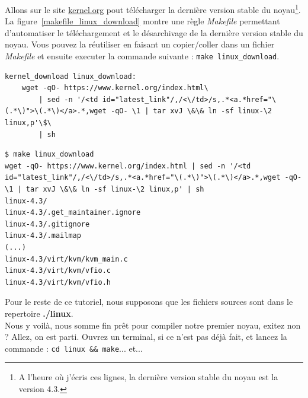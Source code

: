 \documentclass[a4paper]{article}
\begin{document}
Allons sur le site \href{http://www.kernel.org}{kernel.org} pout télécharger la dernière version stable du noyau\footnote{A l'heure où j'écris ces lignes, la dernière version stable du noyau est la version 4.3.}. La figure~\ref{makefile_linux_download} montre une règle \textit{Makefile} permettant d'automatiser le téléchargement et le désarchivage de la dernière version stable du noyau. Vous pouvez la réutiliser en faisant un copier/coller dans un fichier \textit{Makefile} et ensuite executer la commande suivante : \lstset{language=sh}\lstinline{make linux_download}.\\

\begin{verbatim}
kernel_download linux_download:
	wget -qO- https://www.kernel.org/index.html\
		| sed -n '/<td id="latest_link"/,/<\/td>/s,.*<a.*href="\(.*\)">\(.*\)</a>.*,wget -qO- \1 | tar xvJ \&\& ln -sf linux-\2 linux,p'\$\
		| sh
\end{verbatim}

\label{make_linux_download}
\begin{verbatim}
$ make linux_download 
wget -qO- https://www.kernel.org/index.html | sed -n '/<td id="latest_link"/,/<\/td>/s,.*<a.*href="\(.*\)">\(.*\)</a>.*,wget -qO- \1 | tar xvJ \&\& ln -sf linux-\2 linux,p' | sh
linux-4.3/
linux-4.3/.get_maintainer.ignore
linux-4.3/.gitignore
linux-4.3/.mailmap
(...)
linux-4.3/virt/kvm/kvm_main.c
linux-4.3/virt/kvm/vfio.c
linux-4.3/virt/kvm/vfio.h
\end{verbatim}

Pour le reste de ce tutoriel, nous supposons que les fichiers sources sont dans le repertoire \textbf{./linux}.\\

Nous y voilà, nous somme fin prêt pour compiler notre premier noyau, exitez non ? Allez, on est parti. Ouvrez un terminal, si ce n'est pas déjà fait, et lancez la commande : \lstset{language=sh}\lstinline{cd linux && make}... et...
\end{document}
